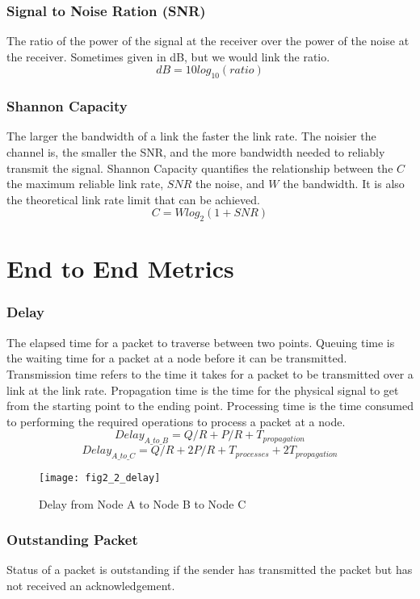 \subsubsection*{Signal to Noise Ration (SNR)}
The ratio of the power of the signal at the receiver over the power of the noise at the receiver. Sometimes given in dB, but we would link the ratio. 
$$dB = 10log_{10}(ratio)$$
\subsubsection*{Shannon Capacity}
The larger the bandwidth of a link the faster the link rate. The noisier the channel is, the smaller the SNR, and the more bandwidth needed to reliably transmit the signal. Shannon Capacity quantifies the relationship between the $C$ the maximum reliable link rate, $SNR$ the noise, and $W$ the bandwidth. It is also the theoretical link rate limit that can be achieved. 
 $$C = Wlog_2(1+SNR)$$

\section{End to End Metrics}
\subsubsection*{Delay}
The elapsed time for a packet to traverse between two points. Queuing time is the waiting time for a packet at a node before it can be transmitted. Transmission time refers to the time it takes for a packet to be transmitted over a link at the link rate. Propagation time is the time for the physical signal to get from the starting point to the ending point. Processing time is the time consumed to performing the required operations to process a packet at a node. 
$$Delay_{A\_to\_B} = Q/R + P/R + T_{propagation}$$
$$Delay_{A\_to\_C} = Q/R + 2P/R + T_{processes} + 2T_{propagation}$$

\begin{figure}[!htbp]
    \centering
    \texttt{[image: fig2\_2\_delay]}
    \caption{Delay from Node A to Node B to Node C}
    \label{fig:Delay}
\end{figure}

\subsubsection*{Outstanding Packet}
Status of a packet is outstanding if the sender has transmitted the packet but has not received an acknowledgement.
